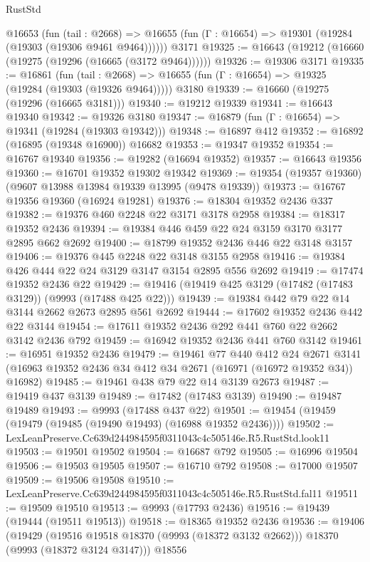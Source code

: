 \begin{lexlean}{RustStd}
\begin{coremodule}
    @16653
      (fun (tail : @2668) =>
      @16655 (fun (Γ : @16654) => @19301 (@19284 (@19303 (@19306 @9461 @9464))))))
    @3171
@19325 := @16643 (@19212 (@16660 (@19275 (@19296 (@16665 (@3172 @9464))))))
@19326 := @19306 @3171
@19335 := @16861
    (fun (tail : @2668) => @16655 (fun (Γ : @16654) => @19325 (@19284 (@19303 (@19326 @9464)))))
    @3180
@19339 := @16660 (@19275 (@19296 (@16665 @3181)))
@19340 := @19212 @19339
@19341 := @16643 @19340
@19342 := @19326 @3180
@19347 := @16879 (fun (Γ : @16654) => @19341 (@19284 (@19303 @19342)))
@19348 := @16897 @412
@19352 := @16892 (@16895 (@19348 @16900)) @16682
@19353 := @19347 @19352
@19354 := @16767 @19340
@19356 := @19282 (@16694 @19352)
@19357 := @16643 @19356
@19360 := @16701 @19352 @19302 @19342
@19369 := @19354 (@19357 @19360) (@9607 @13988 @13984 @19339 @13995 (@9478 @19339))
@19373 := @16767 @19356 @19360 (@16924 @19281)
@19376 := @18304 @19352 @2436 @337
@19382 := @19376 @460 @2248 @22 @3171 @3178 @2958
@19384 := @18317 @19352 @2436
@19394 := @19384 @446 @459 @22 @24 @3159 @3170 @3177 @2895 @662 @2692
@19400 := @18799 @19352 @2436 @446 @22 @3148 @3157
@19406 := @19376 @445 @2248 @22 @3148 @3155 @2958
@19416 := @19384 @426 @444 @22 @24 @3129 @3147 @3154 @2895 @556 @2692
@19419 := @17474 @19352 @2436 @22
@19429 := @19416 (@19419 @425 @3129 (@17482 (@17483 @3129)) (@9993 (@17488 @425 @22)))
@19439 := @19384 @442 @79 @22 @14 @3144 @2662 @2673 @2895 @561 @2692
@19444 := @17602 @19352 @2436 @442 @22 @3144
@19454 := @17611 @19352 @2436 @292 @441 @760 @22 @2662 @3142 @2436 @792
@19459 := @16942 @19352 @2436 @441 @760 @3142
@19461 := @16951 @19352 @2436
@19479 := @19461
    @77
    @440
    @412
    @24
    @2671
    @3141
    (@16963 @19352 @2436 @34 @412 @34 @2671 (@16971 (@16972 @19352 @34)) @16982)
@19485 := @19461 @438 @79 @22 @14 @3139 @2673
@19487 := @19419 @437 @3139
@19489 := @17482 (@17483 @3139)
@19490 := @19487 @19489
@19493 := @9993 (@17488 @437 @22)
@19501 := @19454 (@19459 (@19479 (@19485 (@19490 @19493) (@16988 @19352 @2436))))
@19502 := LexLeanPreserve.Cc639d244984595f0311043c4c505146e.R5.RustStd.look11
@19503 := @19501 @19502
@19504 := @16687 @792
@19505 := @16996 @19504
@19506 := @19503 @19505
@19507 := @16710 @792
@19508 := @17000 @19507
@19509 := @19506 @19508
@19510 := LexLeanPreserve.Cc639d244984595f0311043c4c505146e.R5.RustStd.fal11
@19511 := @19509 @19510
@19513 := @9993 (@17793 @2436)
@19516 := @19439 (@19444 (@19511 @19513))
@19518 := @18365 @19352 @2436
@19536 := @19406
    (@19429 (@19516 @19518 @18370 (@9993 (@18372 @3132 @2662))) @18370 (@9993 (@18372 @3124 @3147)))
    @18556

\end{coremodule}
\end{lexlean}
